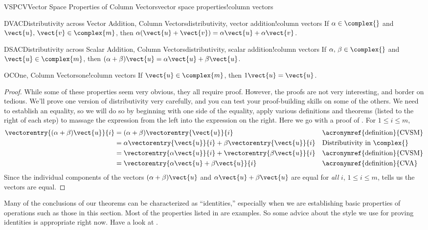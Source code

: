 \begin{theorem}{VSPCV}{Vector Space Properties of Column Vectors}{vector space properties!column vectors}
\begin{propertylist}
\begin{property}{DVAC}{Distributivity across Vector Addition, Column Vectors}{distributivity, vector addition!column vectors}
If $\alpha\in\complex{\null}$ and $\vect{u},\,\vect{v}\in\complex{m}$, then $\alpha(\vect{u}+\vect{v})=\alpha\vect{u}+\alpha\vect{v}$.\end{property}
%
\begin{property}{DSAC}{Distributivity across Scalar Addition, Column Vectors}{distributivity, scalar addition!column vectors}
If $\alpha,\,\beta\in\complex{\null}$ and $\vect{u}\in\complex{m}$, then
$(\alpha+\beta)\vect{u}=\alpha\vect{u}+\beta\vect{u}$.\end{property}
%
\begin{property}{OC}{One, Column Vectors}{one!column vectors}
If $\vect{u}\in\complex{m}$, then $1\vect{u}=\vect{u}$.\end{property}
%
\end{propertylist}
\end{theorem}
%
\begin{proof}
While some of these properties seem very obvious, they all require proof.  However, the proofs are not very interesting, and border on tedious. We'll prove one version of distributivity very carefully, and you can test your proof-building skills on some of the others.  We need to establish an equality, so we will do so by beginning with one side of the equality, apply various definitions and theorems (listed to the right of each step) to massage the expression from the left into the expression on the right.   Here we go with a proof of .   For $1\leq i\leq m$,
%
\begin{align*}
\vectorentry{(\alpha+\beta)\vect{u}}{i}
&=(\alpha+\beta)\vectorentry{\vect{u}}{i}
&&\text{\acronymref{definition}{CVSM}}\\
%
&=\alpha\vectorentry{\vect{u}}{i}+\beta\vectorentry{\vect{u}}{i}
&&\text{Distributivity in $\complex{\null}$}\\
%
&=\vectorentry{\alpha\vect{u}}{i}+\vectorentry{\beta\vect{u}}{i}
&&\text{\acronymref{definition}{CVSM}}\\
%
&=\vectorentry{\alpha\vect{u}+\beta\vect{u}}{i}
&&\text{\acronymref{definition}{CVA}}\\
%
\end{align*}
%
Since the individual components of the vectors $(\alpha+\beta)\vect{u}$ and $\alpha\vect{u}+\beta\vect{u}$ are equal for {\em all} $i$, $1\leq i\leq m$,  tells us the vectors are equal.
%
\end{proof}
%
Many of the conclusions of our theorems can be characterized as ``identities,''  especially when we are establishing basic properties of operations such as those in this section.  Most of the properties listed in  are examples.  So some advice about the style we use for proving identities is appropriate right now.  Have a look at .\par
